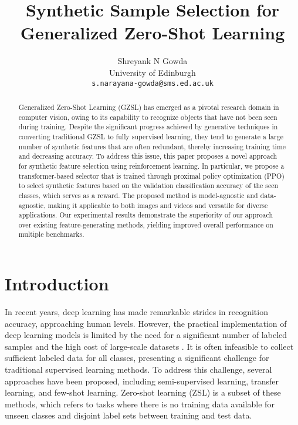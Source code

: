 \documentclass[10pt,twocolumn,letterpaper]{article}
\begin{document}
\title{Synthetic Sample Selection for Generalized Zero-Shot Learning}

\author{Shreyank N Gowda\\
University of Edinburgh\\
{\tt\small s.narayana-gowda@sms.ed.ac.uk}
}
\maketitle

\begin{abstract}
Generalized Zero-Shot Learning (GZSL) has emerged as a pivotal research domain in computer vision, owing to its capability to recognize objects that have not been seen during training. Despite the significant progress achieved by generative techniques in converting traditional GZSL to fully supervised learning, they tend to generate a large number of synthetic features that are often redundant, thereby increasing training time and decreasing accuracy. To address this issue, this paper proposes a novel approach for synthetic feature selection using reinforcement learning. In particular, we propose a transformer-based selector that is trained through proximal policy optimization (PPO) to select synthetic features based on the validation classification accuracy of the seen classes, which serves as a reward. The proposed method is model-agnostic and data-agnostic, making it applicable to both images and videos and versatile for diverse applications. Our experimental results demonstrate the superiority of our approach over existing feature-generating methods, yielding improved overall performance on multiple benchmarks.
\end{abstract}

\section{Introduction}
\label{sec:intro}

In recent years, deep learning \cite{resnet,densenet,vgg,colornet} has made remarkable strides in recognition accuracy, approaching human levels. However, the practical implementation of deep learning models is limited by the need for a significant number of labeled samples and the high cost of large-scale datasets \cite{imagenet}. It is often infeasible to collect sufficient labeled data for all classes, presenting a significant challenge for traditional supervised learning methods. To address this challenge, several approaches have been proposed, including semi-supervised learning, transfer learning, and few-shot learning. Zero-shot learning (ZSL) \cite{palatucci2009zero} is a subset of these methods, which refers to tasks where there is no training data available for unseen classes and disjoint label sets between training and test data.
\end{document}
